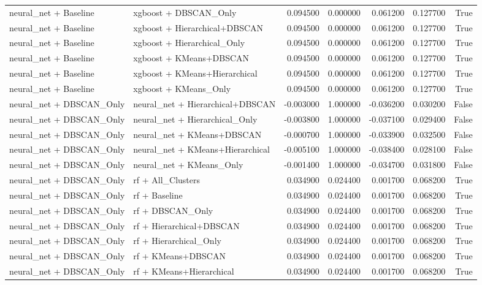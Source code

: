 \begin{tabular}{llrrrrr}
neural_net + Baseline & xgboost + DBSCAN_Only & 0.094500 & 0.000000 & 0.061200 & 0.127700 & True \\
neural_net + Baseline & xgboost + Hierarchical+DBSCAN & 0.094500 & 0.000000 & 0.061200 & 0.127700 & True \\
neural_net + Baseline & xgboost + Hierarchical_Only & 0.094500 & 0.000000 & 0.061200 & 0.127700 & True \\
neural_net + Baseline & xgboost + KMeans+DBSCAN & 0.094500 & 0.000000 & 0.061200 & 0.127700 & True \\
neural_net + Baseline & xgboost + KMeans+Hierarchical & 0.094500 & 0.000000 & 0.061200 & 0.127700 & True \\
neural_net + Baseline & xgboost + KMeans_Only & 0.094500 & 0.000000 & 0.061200 & 0.127700 & True \\
neural_net + DBSCAN_Only & neural_net + Hierarchical+DBSCAN & -0.003000 & 1.000000 & -0.036200 & 0.030200 & False \\
neural_net + DBSCAN_Only & neural_net + Hierarchical_Only & -0.003800 & 1.000000 & -0.037100 & 0.029400 & False \\
neural_net + DBSCAN_Only & neural_net + KMeans+DBSCAN & -0.000700 & 1.000000 & -0.033900 & 0.032500 & False \\
neural_net + DBSCAN_Only & neural_net + KMeans+Hierarchical & -0.005100 & 1.000000 & -0.038400 & 0.028100 & False \\
neural_net + DBSCAN_Only & neural_net + KMeans_Only & -0.001400 & 1.000000 & -0.034700 & 0.031800 & False \\
neural_net + DBSCAN_Only & rf + All_Clusters & 0.034900 & 0.024400 & 0.001700 & 0.068200 & True \\
neural_net + DBSCAN_Only & rf + Baseline & 0.034900 & 0.024400 & 0.001700 & 0.068200 & True \\
neural_net + DBSCAN_Only & rf + DBSCAN_Only & 0.034900 & 0.024400 & 0.001700 & 0.068200 & True \\
neural_net + DBSCAN_Only & rf + Hierarchical+DBSCAN & 0.034900 & 0.024400 & 0.001700 & 0.068200 & True \\
neural_net + DBSCAN_Only & rf + Hierarchical_Only & 0.034900 & 0.024400 & 0.001700 & 0.068200 & True \\
neural_net + DBSCAN_Only & rf + KMeans+DBSCAN & 0.034900 & 0.024400 & 0.001700 & 0.068200 & True \\
neural_net + DBSCAN_Only & rf + KMeans+Hierarchical & 0.034900 & 0.024400 & 0.001700 & 0.068200 & True \\

\end{tabular}
